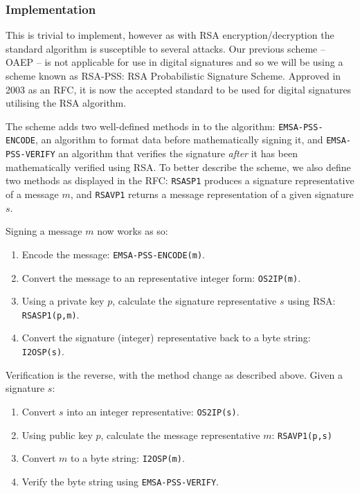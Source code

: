   \subsubsection{Implementation}
  
    This is trivial to implement, however as with RSA encryption/decryption the standard algorithm is susceptible to several attacks. Our previous scheme -- OAEP -- is not applicable for use in digital signatures and so we will be using a scheme known as RSA-PSS: RSA Probabilistic Signature Scheme. Approved in 2003 as an RFC\cite{Jonsson:2003aa}, it is now the accepted standard to be used for digital signatures utilising the RSA algorithm.
    
    The scheme adds two well-defined methods in to the algorithm: \verb!EMSA-PSS-ENCODE!, an algorithm to format data before mathematically signing it, and \verb!EMSA-PSS-VERIFY! an algorithm that verifies the signature \emph{after} it has been mathematically verified using RSA. To better describe the scheme, we also define two methods as displayed in the RFC\cite{Jonsson:2003aa}: \verb!RSASP1! produces a signature representative of a message $m$, and \verb!RSAVP1! returns a message representation of a given signature $s$.
    
    Signing a message $m$ now works as so:
    
    \begin{enumerate}
      \item Encode the message: \verb!EMSA-PSS-ENCODE(m)!.
      \item Convert the message to an representative integer form: \verb!OS2IP(m)!.
      \item Using a private key $p$, calculate the signature representative $s$ using RSA: \verb!RSASP1(p,m)!.
      \item Convert the signature (integer) representative back to a byte string: \verb!I2OSP(s)!.
    \end{enumerate}
    
    Verification is the reverse, with the method change as described above. Given a signature $s$:
    
    \begin{enumerate}
      \item Convert $s$ into an integer representative: \verb!OS2IP(s)!.
      \item Using public key $p$, calculate the message representative $m$: \verb!RSAVP1(p,s)!
      \item Convert $m$ to a byte string: \verb!I2OSP(m)!.
      \item Verify the byte string using \verb!EMSA-PSS-VERIFY!.
    \end{enumerate}
    
